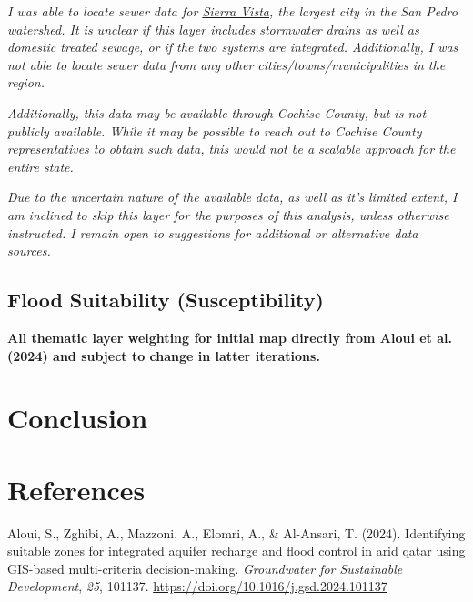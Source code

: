 \documentclass[
]{agujournal2019}
\newlength{\cslhangindent}
\newenvironment{CSLReferences}[2] %
 {\begin{list}{}{%
  \setlength{\itemindent}{0pt}
  \setlength{\leftmargin}{0pt}
  \setlength{\parsep}{0pt}
  \ifodd #1
   \setlength{\leftmargin}{\cslhangindent}
   \setlength{\itemindent}{-1\cslhangindent}
  \fi
  \setlength{\itemsep}{#2\baselineskip}}}
 {\end{list}}
\begin{document}
\begin{tcolorbox}[enhanced jigsaw, coltitle=black, colbacktitle=quarto-callout-note-color!10!white, opacityback=0, leftrule=.75mm, colback=white, bottomrule=.15mm, colframe=quarto-callout-note-color-frame, title=\textcolor{quarto-callout-note-color}{\faInfo}\hspace{0.5em}{Note}, left=2mm, toptitle=1mm, bottomtitle=1mm, breakable, rightrule=.15mm, toprule=.15mm, arc=.35mm, titlerule=0mm, opacitybacktitle=0.6]

\emph{I was able to locate sewer data for
\href{https://cosvazgis-sierravista.hub.arcgis.com/maps/bd8411bd3f1a485395f057636aa94b09/explore?location=31.560760\%2C-110.206043\%2C-1.00}{Sierra
Vista}, the largest city in the San Pedro watershed. It is unclear if
this layer includes stormwater drains as well as domestic treated
sewage, or if the two systems are integrated. Additionally, I was not
able to locate sewer data from any other cities/towns/municipalities in
the region.}

\emph{Additionally, this data may be available through Cochise County,
but is not publicly available. While it may be possible to reach out to
Cochise County representatives to obtain such data, this would not be a
scalable approach for the entire state.}

\emph{Due to the uncertain nature of the available data, as well as it's
limited extent, I am inclined to skip this layer for the purposes of
this analysis, unless otherwise instructed. I remain open to suggestions
for additional or alternative data sources.}

\end{tcolorbox}

\subsection{Flood Suitability
(Susceptibility)}\label{flood-suitability-susceptibility}

\textbf{All thematic layer weighting for initial map directly from Aloui
et al. (2024) and subject to change in latter iterations.}

\section{Conclusion}\label{conclusion}

\section*{References}\label{references}

\label{refs}
\begin{CSLReferences}{1}{0}
\vspace{1em}

Aloui, S., Zghibi, A., Mazzoni, A., Elomri, A., \& Al-Ansari, T. (2024).
Identifying suitable zones for integrated aquifer recharge and flood
control in arid qatar using GIS-based multi-criteria decision-making.
\emph{Groundwater for Sustainable Development}, \emph{25}, 101137.
\url{https://doi.org/10.1016/j.gsd.2024.101137}

\end{CSLReferences}
\end{document}
